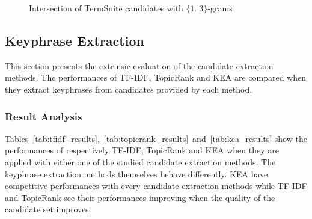 \begin{figure*}
        \caption{Intersection of TermSuite candidates with $\{1..3\}$-grams
                 \label{fig:candidate_intersections}}
      \end{figure*}

  \subsection{Keyphrase Extraction}
  \label{subsec:keyphrase_extraction}
    This section presents the extrinsic evaluation of the candidate extraction
    methods. The performances of TF-IDF, TopicRank and KEA are compared when
    they extract keyphrases from candidates provided by each method.

    \subsubsection{Result Analysis}
    \label{subsubsec:candidate_extraction_result_analysis}
      Tables~\ref{tab:tfidf_results},~\ref{tab:topicrank_results}~and~\ref{tab:kea_results}
      show the performances of respectively TF-IDF, TopicRank and KEA when
      they are applied with either one of the studied candidate extraction
      methods. The keyphrase extraction methods themselves behave differently.
      KEA have competitive performances with every candidate extraction methods
      while TF-IDF and TopicRank see their performances improving when the
      quality of the candidate set improves.

